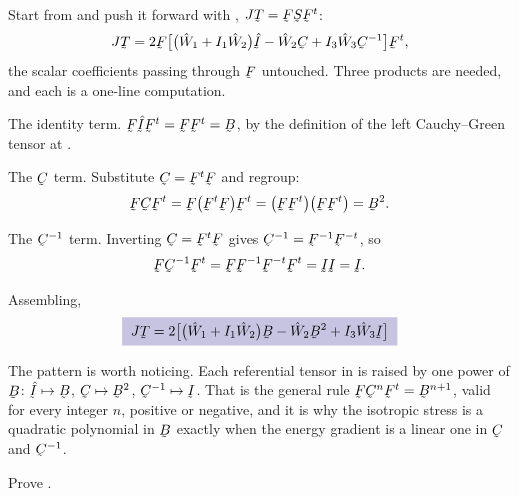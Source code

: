 \begin{solution}
Start from  and push it forward with ,
$J\bT=\bF\bS\bF^{t}$:
\[
   J\bT=2\bF\big[\big(\hat W_{1}+I_{1}\hat W_{2}\big)\hI
   -\hat W_{2}\bC+I_{3}\hat W_{3}\bC^{-1}\big]\bF^{t},
\]
the scalar coefficients passing through $\bF$ untouched. Three products
are needed, and each is a one-line computation.

The identity term. $\bF\hI\bF^{t}=\bF\bF^{t}=\bB$, by the definition of
the left Cauchy--Green tensor at .

The $\bC$ term. Substitute $\bC=\bF^{t}\bF$ and regroup:
\[
   \bF\bC\bF^{t}=\bF\big(\bF^{t}\bF\big)\bF^{t}
   =\big(\bF\bF^{t}\big)\big(\bF\bF^{t}\big)=\bB^{2}.
\]

The $\bC^{-1}$ term. Inverting $\bC=\bF^{t}\bF$ gives
$\bC^{-1}=\bF^{-1}\bF^{-t}$, so
\[
   \bF\bC^{-1}\bF^{t}=\bF\bF^{-1}\bF^{-t}\bF^{t}=\I\I=\I .
\]

Assembling,
\[
   \boxed{\;J\bT=2\big[\big(\hat W_{1}+I_{1}\hat W_{2}\big)\bB
   -\hat W_{2}\bB^{2}+I_{3}\hat W_{3}\I\big]\;}
\]

The pattern is worth noticing. Each referential tensor in  is
raised by one power of $\bB$: $\hI\mapsto\bB$, $\bC\mapsto\bB^{2}$,
$\bC^{-1}\mapsto\I$. That is the general rule $\bF\bC^{n}\bF^{t}
=\bB^{n+1}$, valid for every integer $n$, positive or negative, and it
is why the isotropic stress is a quadratic polynomial in $\bB$ exactly
when the energy gradient is a linear one in $\bC$ and $\bC^{-1}$.
\end{solution}

\begin{problem}
Prove .
\end{problem}

